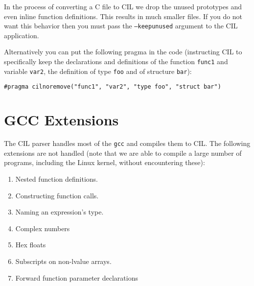 \documentclass{article}
\def\t#1{{\tt #1}}
\begin{document}
 In the process of converting a C file to CIL we drop the unused prototypes
and even inline function definitions. This results in much smaller files. If
you do not want this behavior then you must pass the \t{--keepunused} argument
to the CIL application. 

 Alternatively you can put the following pragma in the code (instructing CIL
to specifically keep the declarations and definitions of the function
\t{func1} and variable \t{var2}, the definition of type \t{foo} and of
structure \t{bar}):
\begin{verbatim}
#pragma cilnoremove("func1", "var2", "type foo", "struct bar")
\end{verbatim}



\section{GCC Extensions}

 The CIL parser handles most of the \t{gcc}
and compiles them to CIL. The following extensions are not handled (note that
we are able to compile a large number of programs, including the Linux kernel,
without encountering these):

\begin{enumerate}
\item Nested function definitions.
\item Constructing function calls.
\item Naming an expression's type.
\item Complex numbers
\item Hex floats
\item Subscripts on non-lvalue arrays.
\item Forward function parameter declarations
\end{enumerate}
\end{document}
